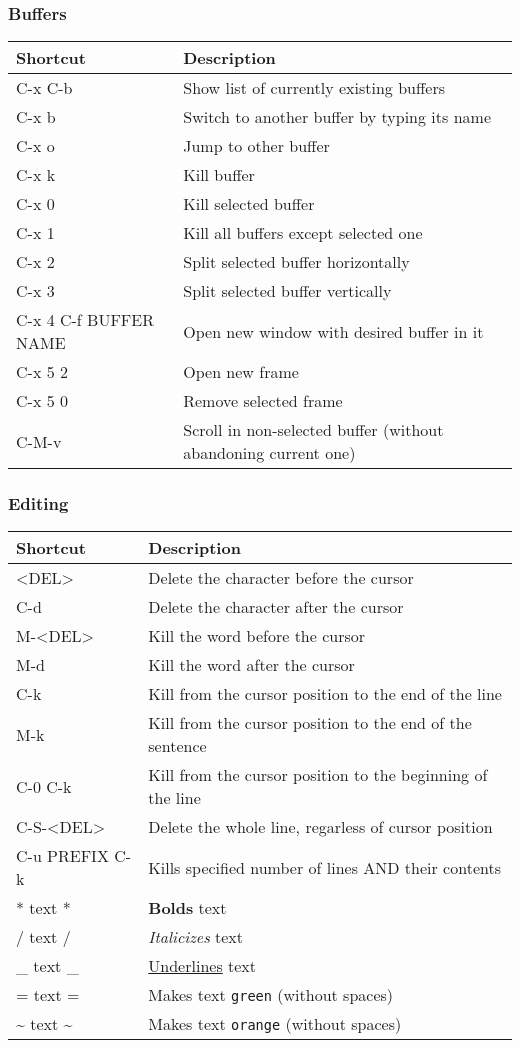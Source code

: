 \documentclass[11pt]{article}
\begin{document}
\subsubsection{Buffers}
\label{sec:org46191c0}
\begin{center}
\begin{tabular}{ll}
\hline
Shortcut & Description\\
\hline
C-x C-b & Show list of currently existing buffers\\
C-x b & Switch to another buffer by typing its name\\
C-x o & Jump to other buffer\\
C-x k & Kill buffer\\
C-x 0 & Kill selected buffer\\
C-x 1 & Kill all buffers except selected one\\
C-x 2 & Split selected buffer horizontally\\
C-x 3 & Split selected buffer vertically\\
C-x 4 C-f BUFFER NAME & Open new window with desired buffer in it\\
C-x 5 2 & Open new frame\\
C-x 5 0 & Remove selected frame\\
C-M-v & Scroll in non-selected buffer (without abandoning current one)\\
\hline
\end{tabular}
\end{center}
\subsubsection{Editing}
\label{sec:orgd92e6e5}
\begin{center}
\begin{tabular}{ll}
\hline
Shortcut & Description\\
\hline
<DEL> & Delete the character before the cursor\\
C-d & Delete the character after the cursor\\
M-<DEL> & Kill the word before the cursor\\
M-d & Kill the word after the cursor\\
C-k & Kill from the cursor position to the end of the line\\
M-k & Kill from the cursor position to the end of the sentence\\
C-0 C-k & Kill from the cursor position to the beginning of the line\\
C-S-<DEL> & Delete the whole line, regarless of cursor position\\
C-u PREFIX C-k & Kills specified number of lines AND their contents\\
* text * & \textbf{Bolds} text\\
/ text / & \emph{Italicizes} text\\
\_ text \_ & \uline{Underlines} text\\
= text = & Makes text \texttt{green} (without spaces)\\
\textasciitilde{} text \textasciitilde{} & Makes text \texttt{orange} (without spaces)\\
\hline
\end{tabular}
\end{center}
\end{document}
